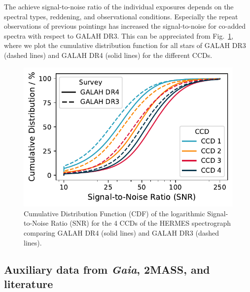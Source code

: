 \documentclass[
  journal=pasa,
  manuscript=research-paper, %
  year=2024,
  volume=37
]{cup-journal}
\newcommand{\Gaia}{\textit{Gaia}\xspace}
\begin{document}
The achieve signal-to-noise ratio of the individual exposures depends on the spectral types, reddening, and observational conditions. Especially the repeat observations of previous pointings has increased the signal-to-noise for co-added spectra with respect to GALAH DR3. This can be appreciated from Fig.~\ref{fig:snr_distribution}, where we plot the cumulative distribution function for all stars of GALAH DR3 (dashed lines) and GALAH DR4 (solid lines) for the different CCDs. 

\begin{figure}[ht]
    \centering
    \includegraphics[width=\columnwidth]{figures/snr_distribution.pdf}
    \caption{Cumulative Distribution Function (CDF) of the logarithmic Signal-to-Noise Ratio (SNR) for the 4 CCDs of the HERMES spectrograph comparing GALAH DR4 (solid lines) and GALAH DR3 (dashed lines).}
    \label{fig:snr_distribution}
\end{figure}

\subsection{Auxiliary data from \Gaia, 2MASS, and literature} \label{sec:non-spec_data}

\end{document}
